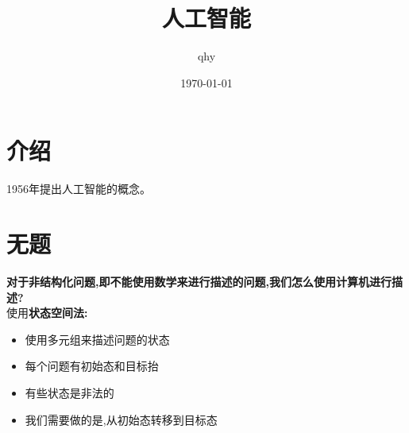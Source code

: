 \documentclass[UTF8,a4paper]{ctexart}
\author{ qhy }
\date{\today}
\title{人工智能}
\begin{document}
  \maketitle
  \tableofcontents
  \newpage

  \section{介绍}
  1956年提出人工智能的概念。

  \section{无题}
  \textbf{对于非结构化问题,即不能使用数学来进行描述的问题,我们怎么使用计算机进行描述?}\\
  使用\textbf{状态空间法:}
  \begin{itemize}
    \item 使用多元组来描述问题的状态
    \item 每个问题有初始态和目标抬
    \item 有些状态是非法的
    \item 我们需要做的是,从初始态转移到目标态
  \end{itemize}
\end{document}
